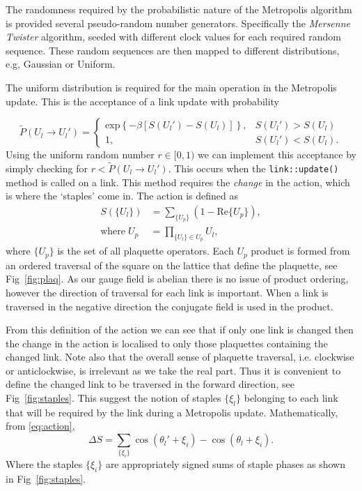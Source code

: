 \documentclass[12pt]{article}
\begin{document}
\par The randomness required by the probabilistic nature of the Metropolis algorithm is provided several pseudo-random number generators. Specifically the \emph{Mersenne Twister} algorithm, seeded with different clock values for each required random sequence. These random sequences are then mapped to different distributions, e.g, Gaussian or Uniform.

\par The uniform distribution is required for the main operation in the Metropolis update. This is the acceptance of a link update with probability 

\begin{equation}
\tilde{P}(U_l \rightarrow U_l') =  \begin{cases} 
      \mathrm{exp}\left\{-\beta \left[S(U_l')-S(U_l) \right]\right\}, & S(U_l') > S(U_l) \\    
      1, &  S(U_l') < S(U_l).
   \end{cases}
\end{equation}
Using the uniform random number $r \in [0,1)$ we can implement this acceptance by simply checking for $r<\tilde{P}(U_l \rightarrow U_l')$. This occurs when the \texttt{link::update()} method is called on a link. This method requires the \emph{change} in the action, which is where the `staples' come in. The action is defined as
\begin{align}
    \label{eq:action}
    S(\{U_l\}) &= \sum_{\{U_p\}}(1-\mathrm{Re}\{U_p\}),\\
    \mathrm{where} \; U_p &= \prod_{\{U_l\} \in U_p} U_l,
\end{align}
where $\{U_p\}$ is the set of all plaquette operators. Each $U_p$ product is formed from an ordered traversal of the square on the lattice that define the plaquette, see Fig~\ref{fig:plaq}. As our gauge field is abelian there is no issue of product ordering, however the direction of traversal for each link is important. When a link is traversed in the negative direction the conjugate field is used in the product.

\par From this definition of the action we can see that if only one link is changed then the change in the action is localised to only those plaquettes containing the changed link. Note also that the overall sense of plaquette traversal, i.e. clockwise or anticlockwise, is irrelevant as we take the real part. Thus it is convenient to define the changed link to be traversed in the forward direction, see Fig~\ref{fig:staples}. This suggest the notion of staples $\{\xi_l\}$ belonging to each link that will be required by the link during a Metropolis update. Mathematically, from \eqref{eq:action}, \begin{equation}
    \Delta S = \sum_{\{\xi_i\}} \cos(\theta_l' + \xi_i) - \cos(\theta_l + \xi_i).
\end{equation}
Where the staples $\{\xi_i\}$ are appropriately signed sums of staple phases as shown in Fig~\ref{fig:staples}.
\end{document}
